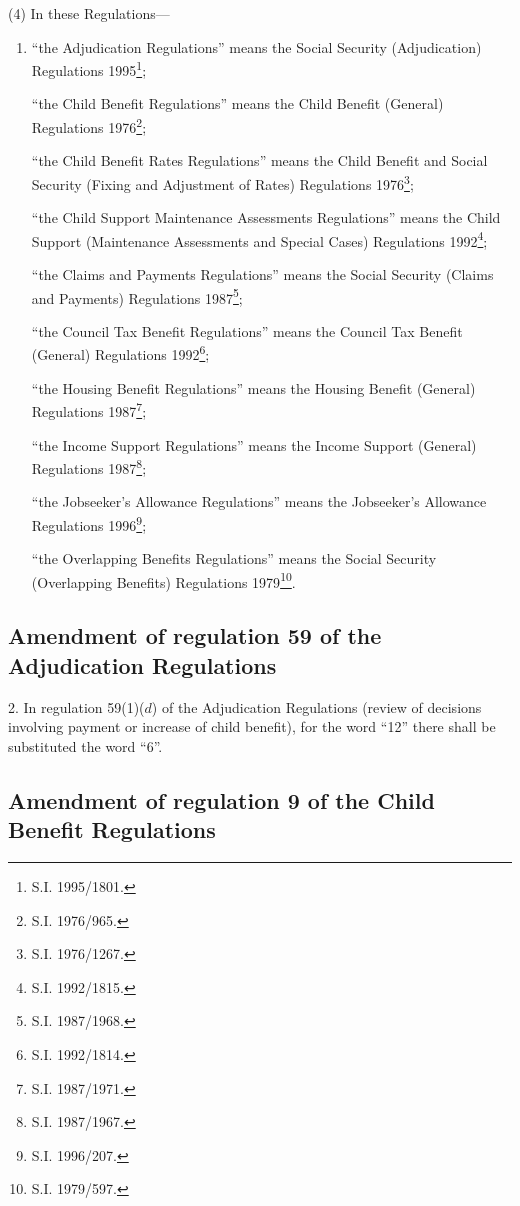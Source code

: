 \documentclass[a4paper]{article}
\newcommand\fnote[1]{\footnote{\frenchspacing #1}}
\begin{document}
(4) In these Regulations—
\begin{enumerate}\item[]
“the Adjudication Regulations” means the Social Security (Adjudication) Regulations 1995\fnote{S.I. 1995/1801.};

“the Child Benefit Regulations” means the Child Benefit (General) Regulations 1976\fnote{S.I. 1976/965.};

“the Child Benefit Rates Regulations” means the Child Benefit and Social Security (Fixing and Adjustment of Rates) Regulations 1976\fnote{S.I. 1976/1267.};

“the Child Support Maintenance Assessments Regulations” means the Child Support (Maintenance Assessments and Special Cases) Regulations 1992\fnote{S.I. 1992/1815.};

“the Claims and Payments Regulations” means the Social Security (Claims and Payments) Regulations 1987\fnote{S.I. 1987/1968.};

“the Council Tax Benefit Regulations” means the Council Tax Benefit (General) Regulations 1992\fnote{S.I. 1992/1814.};

“the Housing Benefit Regulations” means the Housing Benefit (General) Regulations 1987\fnote{S.I. 1987/1971.};

“the Income Support Regulations” means the Income Support (General) Regulations 1987\fnote{S.I. 1987/1967.};

\begin{sloppypar}
“the Jobseeker’s Allowance Regulations” means the Jobseeker’s Allowance Regulations 1996\fnote{S.I. 1996/207.};
\end{sloppypar}

“the Overlapping Benefits Regulations” means the Social Security (Overlapping Benefits) Regulations 1979\fnote{S.I. 1979/597.}.
\end{enumerate}

\subsection[2. Amendment of regulation 59 of the Adjudication Regulations]{Amendment of regulation 59 of the Adjudication Regulations}

2.  In regulation 59(1)($d$) of the Adjudication Regulations (review of decisions involving payment or increase of child benefit), for the word “12” there shall be substituted the word “6”.

\subsection[3. Amendment of regulation 9 of the Child Benefit Regulations]{Amendment of regulation 9 of the Child Benefit Regulations}
\end{document}
